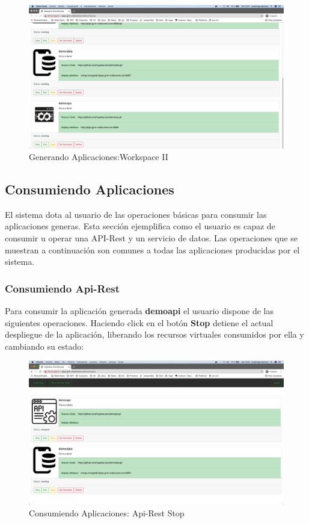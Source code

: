 \documentclass[a4paper,11pt]{book}
\begin{document}
\begin{figure}[H]
\centering
\includegraphics[scale=0.2]{imagenes/casouso/1_2.png}
\caption{   Generando Aplicaciones:Workspace II }
\end{figure}

\subsection{Consumiendo Aplicaciones}

El sistema dota al usuario de las operaciones básicas para consumir las aplicaciones generas. Esta sección ejemplifica como el usuario es capaz de consumir u operar una API-Rest y un servicio de datos. Las operaciones que se muestran a continuación son comunes a todas las aplicaciones producidas por el sistema. 

\subsubsection{Consumiendo Api-Rest}
Para consumir la aplicación generada \textbf{demoapi} el usuario dispone de las siguientes operaciones. Haciendo click en el botón \textbf{Stop} detiene el actual despliegue de la aplicación, liberando los recursos virtuales consumidos por ella y cambiando su estado:

\begin{figure}[H]
\centering
\includegraphics[scale=0.2]{imagenes/casouso/1_3.png}
\caption{  Consumiendo Aplicaciones: Api-Rest  Stop}
\end{figure}
\end{document}
